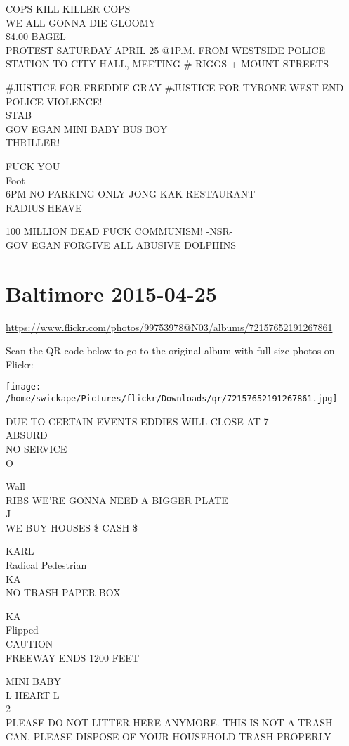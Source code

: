 \documentclass[10pt,letterpaper]{article}
\begin{document}
COPS KILL KILLER COPS\\
WE ALL GONNA DIE GLOOMY\\
\$4.00 BAGEL\\
PROTEST SATURDAY APRIL 25 @1P.M. FROM WESTSIDE POLICE STATION TO CITY HALL, MEETING \# RIGGS + MOUNT STREETS

\#JUSTICE FOR FREDDIE GRAY \#JUSTICE FOR TYRONE WEST END POLICE VIOLENCE!\\
STAB\\
GOV EGAN MINI BABY BUS BOY\\
THRILLER!

FUCK YOU\\
Foot\\
6PM NO PARKING ONLY JONG KAK RESTAURANT\\
RADIUS HEAVE

100 MILLION DEAD FUCK COMMUNISM!  {-}NSR{-}\\
GOV EGAN FORGIVE ALL ABUSIVE DOLPHINS


\section*{Baltimore 2015-04-25}

\url{https://www.flickr.com/photos/99753978@N03/albums/72157652191267861}

Scan the QR code below to go to the original album with full-size photos on Flickr:

\texttt{[image: /home/swickape/Pictures/flickr/Downloads/qr/72157652191267861.jpg]}


DUE TO CERTAIN EVENTS EDDIES WILL CLOSE AT 7\\
ABSURD\\
NO SERVICE\\
O

Wall\\
RIBS WE'RE GONNA NEED A BIGGER PLATE\\
J\\
WE BUY HOUSES \$ CASH \$

KARL\\
Radical Pedestrian\\
KA\\
NO TRASH PAPER BOX

KA\\
Flipped\\
CAUTION\\
FREEWAY ENDS 1200 FEET

MINI BABY\\
L HEART L\\
2\\
PLEASE DO NOT LITTER HERE ANYMORE.  THIS IS NOT A TRASH CAN.  PLEASE DISPOSE OF YOUR HOUSEHOLD TRASH PROPERLY
\end{document}
